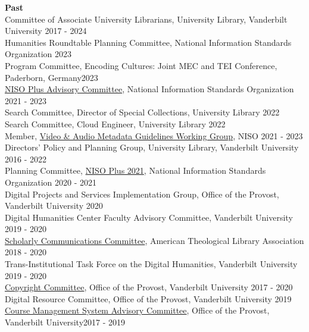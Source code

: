 \documentclass[]{res} %
\begin{document}
\begin{resume}
{\bf Past} \\
Committee of Associate University Librarians, University Library, Vanderbilt University \hfill 2017 - 2024\\
Humanities Roundtable Planning Committee, National Information Standards Organization \hfill 2023\\
Program Committee, Encoding Cultures: Joint MEC and TEI Conference, Paderborn, Germany\hfill 2023\\
\href{https://niso.plus/advisory/}{NISO Plus Advisory Committee}, National Information Standards Organization \hfill 2021 - 2023\\
Search Committee, Director of Special Collections, University Library \hfill 2022 \\
Search Committee, Cloud Engineer, University Library \hfill 2022 \\
Member, \href{https://www.niso.org/standards-committees/video-audio-metadata-guidelines}{Video \& Audio Metadata Guidelines Working Group}, NISO \hfill 2021 - 2023\\ 
Directors' Policy and Planning Group, University Library, Vanderbilt University \hfill 2016 - 2022\\
Planning Committee, \href{https://niso.plus/niso-plus-goes-global/}{NISO Plus 2021}, National Information Standards Organization \hfill 2020 - 2021 \\
Digital Projects and Services Implementation Group, Office of the Provost, Vanderbilt University \hfill 2020 \\
Digital Humanities Center Faculty Advisory Committee, Vanderbilt University \hfill 2019 - 2020 \\
\href{https://www.atla.com/about/committees-councils-task-forces/scholarly-communication-committee/}{Scholarly Communications Committee}, American Theological Library Association \hfill 2018 - 2020\\
Trans-Institutional Task Force on the Digital Humanities, Vanderbilt University \hfill 2019 - 2020\\
\href{https://vanderbilt.edu/provost/people/cyrus/committees/copyright-committee.php}{Copyright Committee}, Office of the Provost, Vanderbilt University \hfill 2017 - 2020\\
Digital Resource Committee, Office of the Provost, Vanderbilt University \hfill 2019\\
\href{https://www.vanderbilt.edu/provost/committees/blackboard.php}{Course Management System Advisory Committee}, Office of the Provost, Vanderbilt University\hfill 2017 - 2019\\

\end{resume}
\end{document}
